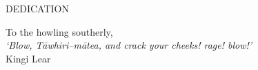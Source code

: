 \newpage
{}

\begin{center}
DEDICATION
\end{center}
\vspace{6cm}

\begin{center}
To the howling southerly,\\
\vspace{3cm}
\textit{`Blow, T\=awhiri--m\=atea, and crack your cheeks! rage! blow!'}\\
Kingi Lear
\end{center}